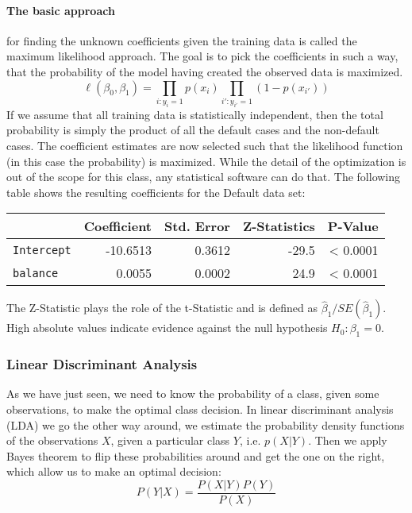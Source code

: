 \paragraph*{The basic approach}for finding the unknown coefficients given the training data is called the maximum likelihood approach.
The goal is to pick the coefficients in such a way, that the probability of the model having created the observed data is maximized.
\[ \ell (\beta_0,\beta_1) = \prod_{i:y_i=1} p(x_i) \prod_{i':y_{i'}=1} (1 - p(x_{i'})) \]
If we assume that all training data is statistically independent, then the total probability is simply  the product of all the default cases and the non-default cases.
The coefficient estimates are now selected such that the likelihood function (in this case the probability) is maximized.
While the detail of the optimization is out of the scope for this class, any statistical software can do  that. The following table shows the resulting coefficients for the Default data set:  \\
\begin{center}
	\begin{tabular}{l|r r r r}
		& Coefficient & Std. Error & Z-Statistics & P-Value \\
		\hline
		\texttt{Intercept} & -10.6513 & 0.3612 & -29.5 & < 0.0001 \\
		\texttt{balance} & 0.0055 & 0.0002 & 24.9 & < 0.0001 \\
	\end{tabular}
\end{center}
The Z-Statistic plays the role of the t-Statistic  and is defined as $\hat{\beta}_1/SE(\hat{\beta}_1)$.
High absolute values indicate evidence against the null hypothesis $H_0 : \beta_1=0$. \\

\subsubsection{Linear Discriminant Analysis}
As we have just seen, we need to know the probability of a class, given some observations, to make the optimal class decision.
In linear discriminant analysis (LDA) we go the other way around, we estimate the probability density functions of the observations $X$, given a particular class $Y$, i.e. $p(X|Y)$.
Then we apply Bayes theorem to flip these probabilities around and get the one on the right, which allow us to make an optimal decision:
\[ P(Y|X)=\frac{P(X|Y)P(Y)}{P(X)} \]

